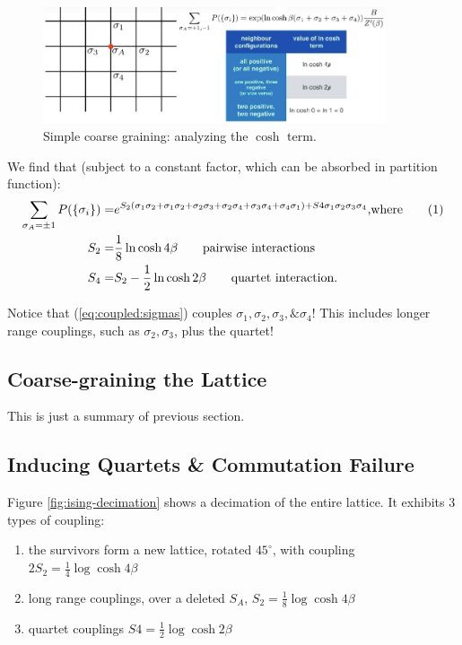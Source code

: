 \documentclass[]{article}
\newcommand\numberthis{\addtocounter{equation}{1}\tag{\theequation}}
\begin{document}
\begin{figure}[H]
	\caption{Simple coarse graining: analyzing the $\cosh$ term.}\label{fig:ising-cosh}
	\includegraphics[width=0.9\textwidth]{ising-cosh}
\end{figure}

We find that (subject to a constant factor, which can be absorbed in partition function):
\begin{align*}
\sum_{\sigma_A=\pm 1} P(\{\sigma_i\}) =&e^{S_2 (\sigma_1\sigma_2 + \sigma_1\sigma_2+ \sigma_2\sigma_3 + \sigma_2 \sigma_4 + \sigma_3 \sigma_4 +\sigma_4 \sigma_1) + S4 \sigma_1 \sigma_2 \sigma_3 \sigma_4} \text{,where} \numberthis \label{eq:coupled:sigmas}\\
S_2 =& \frac{1}{8} \ln{\cosh{4\beta}} \tag*{pairwise interactions}\\
S_4 =& S_2 - \frac{1}{2} \ln{\cosh{2\beta}} \tag*{quartet interaction.}
\end{align*}

Notice that (\ref{eq:coupled:sigmas}) couples $\sigma_1, \sigma_2, \sigma_3, \& \sigma_4$! This includes longer range couplings, such as $\sigma_2, \sigma_3$, plus the quartet!

\subsection{Coarse-graining the Lattice}

This is just a summary of previous section.

\subsection{Inducing Quartets \& Commutation Failure}

Figure \ref{fig:ising-decimation}\cite{aoki2014domain} shows a decimation of the entire lattice. It exhibits 3 types of coupling:

\begin{enumerate}
	\item the survivors form a new lattice, rotated $45^\circ$, with coupling $2S_2=\frac{1}{4} \log{\cosh{4 \beta}}$\label{item:coupling1}
	\item long range couplings, over a deleted $S_A$,  $S_2=\frac{1}{8} \log{\cosh{4 \beta}}$\label{item:coupling2}
	\item quartet couplings $S4=\frac{1}{2} \log{\cosh{2\beta}}$\label{item:coupling3}
\end{enumerate}
\end{document}
